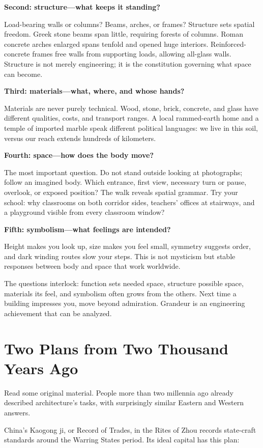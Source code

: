 \textbf{Second: structure---what keeps it standing?}

Load-bearing walls or columns? Beams, arches, or frames? Structure sets spatial freedom. Greek stone beams span little, requiring forests of columns. Roman concrete arches enlarged spans tenfold and opened huge interiors. Reinforced-concrete frames free walls from supporting loads, allowing all-glass walls. Structure is not merely engineering; it is the constitution governing what space can become.

\textbf{Third: materials---what, where, and whose hands?}

Materials are never purely technical. Wood, stone, brick, concrete, and glass have different qualities, costs, and transport ranges. A local rammed-earth home and a temple of imported marble speak different political languages: we live in this soil, versus our reach extends hundreds of kilometers.

\textbf{Fourth: space---how does the body move?}

The most important question. Do not stand outside looking at photographs; follow an imagined body. Which entrance, first view, necessary turn or pause, overlook, or exposed position? The walk reveals spatial grammar. Try your school: why classrooms on both corridor sides, teachers' offices at stairways, and a playground visible from every classroom window?

\textbf{Fifth: symbolism---what feelings are intended?}

Height makes you look up, size makes you feel small, symmetry suggests order, and dark winding routes slow your steps. This is not mysticism but stable responses between body and space that work worldwide.

The questions interlock: function sets needed space, structure possible space, materials its feel, and symbolism often grows from the others. Next time a building impresses you, move beyond admiration. Grandeur is an engineering achievement that can be analyzed.

\section{Two Plans from Two Thousand Years Ago}

Read some original material. People more than two millennia ago already described architecture's tasks, with surprisingly similar Eastern and Western answers.

China's Kaogong ji, or Record of Trades, in the Rites of Zhou records state-craft standards around the Warring States period. Its ideal capital has this plan:

